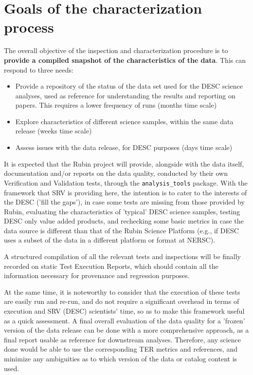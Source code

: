 \documentclass[11pt, a4paper]{article}
\begin{document}
\section{Goals of the characterization process}

The overall objective of the inspection and characterization procedure is to \textbf{provide a compiled snapshot of the characteristics of the data}. This can respond to three needs:

\begin{itemize}
	\item Provide a repository of the status of the data set used for the DESC science analyses, used as reference for understanding the results and reporting on papers. This requires a lower frequency of runs (months time scale)
	\item Explore characteristics of different science samples, within the same data release (weeks time scale)
	\item Assess issues with the data release, for DESC purposes (days time scale)
\end{itemize}

It is expected that the Rubin project will provide, alongside with the data itself, documentation and/or reports on the data quality, conducted by their own Verification and Validation tests, through the {\tt analysis\_tools} package. With the framework that SRV is providing here, the intention is to cater to the interests of the DESC ('fill the gaps'), in case some tests are missing from those provided by Rubin, evaluating the characteristics of 'typical' DESC science samples, testing DESC only value added products, and rechecking some basic metrics in case the data source is different than that of the Rubin Science Platform (e.g., if DESC uses a subset of the data in a different platform or format at NERSC).

A structured compilation of all the relevant tests and inspections will be finally recorded on static Test Execution Reports, which should contain all the information necessary for provenance and regression purposes.

At the same time, it is noteworthy to consider that the execution of these tests are easily run and re-run, and do not require a significant overhead in terms of execution and SRV (DESC) scientists' time, so as to make this framework useful as a quick assessment. A final overall evaluation of the data quality for a 'frozen' version of the data release can be done with a more comprehensive approach, as a final report usable as reference for downstream analyses. Therefore, any science done would be able to use the corresponding TER metrics and references, and minimize any ambiguities as to which version of the data or catalog content is used.
\end{document}

